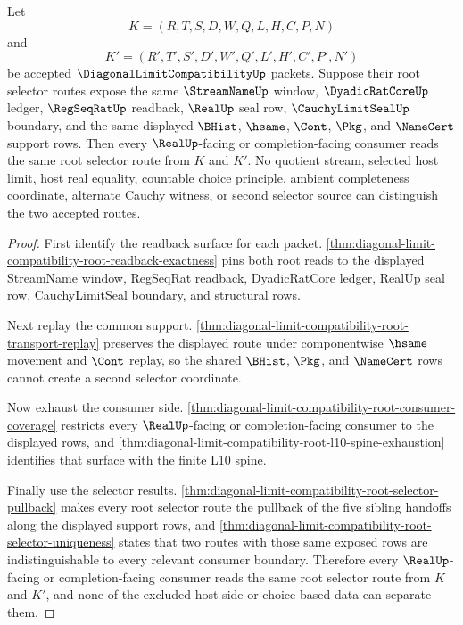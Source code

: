 \begin{theorem}
\label{thm:diagonal-limit-compatibility-root-readback-selector-determinacy}
Let
$$
K=(R,T,S,D,W,Q,L,H,C,P,N)
$$
and
$$
K'=(R',T',S',D',W',Q',L',H',C',P',N')
$$
be accepted $\DiagonalLimitCompatibilityUp$ packets. Suppose their root selector routes expose the same $\StreamNameUp$ window, $\DyadicRatCoreUp$ ledger, $\RegSeqRatUp$ readback, $\RealUp$ seal row, $\CauchyLimitSealUp$ boundary, and the same displayed $\BHist$, $\hsame$, $\Cont$, $\Pkg$, and $\NameCert$ support rows. Then every $\RealUp$-facing or completion-facing consumer reads the same root selector route from $K$ and $K'$. No quotient stream, selected host limit, host real equality, countable choice principle, ambient completeness coordinate, alternate Cauchy witness, or second selector source can distinguish the two accepted routes.
\end{theorem}
\begin{proof}
First identify the readback surface for each packet. \autoref{thm:diagonal-limit-compatibility-root-readback-exactness} pins both root reads to the displayed StreamName window, RegSeqRat readback, DyadicRatCore ledger, RealUp seal row, CauchyLimitSeal boundary, and structural rows.

Next replay the common support. \autoref{thm:diagonal-limit-compatibility-root-transport-replay} preserves the displayed route under componentwise $\hsame$ movement and $\Cont$ replay, so the shared $\BHist$, $\Pkg$, and $\NameCert$ rows cannot create a second selector coordinate.

Now exhaust the consumer side. \autoref{thm:diagonal-limit-compatibility-root-consumer-coverage} restricts every $\RealUp$-facing or completion-facing consumer to the displayed rows, and \autoref{thm:diagonal-limit-compatibility-root-l10-spine-exhaustion} identifies that surface with the finite L10 spine.

Finally use the selector results. \autoref{thm:diagonal-limit-compatibility-root-selector-pullback} makes every root selector route the pullback of the five sibling handoffs along the displayed support rows, and \autoref{thm:diagonal-limit-compatibility-root-selector-uniqueness} states that two routes with those same exposed rows are indistinguishable to every relevant consumer boundary. Therefore every $\RealUp$-facing or completion-facing consumer reads the same root selector route from $K$ and $K'$, and none of the excluded host-side or choice-based data can separate them.
\end{proof}

